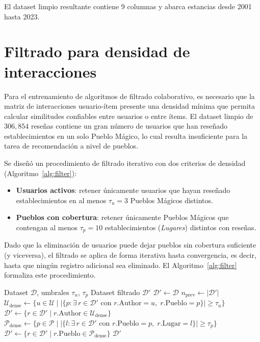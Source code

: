 El dataset limpio resultante contiene 9 columnas y abarca estancias desde 2001 hasta 2023.

\section{Filtrado para densidad de interacciones} \label{sec:filtering}

Para el entrenamiento de algoritmos de filtrado colaborativo, es necesario que la matriz de interacciones usuario-ítem presente una densidad mínima que permita calcular similitudes confiables entre usuarios o entre ítems. El dataset limpio de $306{,}854$ reseñas contiene un gran número de usuarios que han reseñado establecimientos en un solo Pueblo Mágico, lo cual resulta insuficiente para la tarea de recomendación a nivel de pueblos.

Se diseñó un procedimiento de filtrado iterativo con dos criterios de densidad (Algoritmo~\ref{alg:filter}):

\begin{itemize}
	\item \textbf{Usuarios activos}: retener únicamente usuarios que hayan reseñado establecimientos en al menos $\tau_u = 3$ Pueblos Mágicos distintos.
	\item \textbf{Pueblos con cobertura}: retener únicamente Pueblos Mágicos que contengan al menos $\tau_p = 10$ establecimientos (\textit{Lugares}) distintos con reseñas.
\end{itemize}

Dado que la eliminación de usuarios puede dejar pueblos sin cobertura suficiente (y viceversa), el filtrado se aplica de forma iterativa hasta convergencia, es decir, hasta que ningún registro adicional sea eliminado. El Algoritmo~\ref{alg:filter} formaliza este procedimiento.

\begin{algorithm}[ht]
	\caption{Filtrado iterativo para densidad de interacciones.}
	\label{alg:filter}
	\begin{algorithmic}[1]
		\REQUIRE Dataset $\mathcal{D}$, umbrales $\tau_u$, $\tau_p$
		\ENSURE Dataset filtrado $\mathcal{D}'$
		\STATE $\mathcal{D}' \leftarrow \mathcal{D}$
		\REPEAT
		\STATE $n_{\text{prev}} \leftarrow |\mathcal{D}'|$
		\STATE $\mathcal{U}_{\text{dense}} \leftarrow \{u \in \mathcal{U} \mid |\{p : \exists\, r \in \mathcal{D}' \text{ con } r.\text{Author} = u,\; r.\text{Pueblo} = p\}| \geq \tau_u\}$
		\STATE $\mathcal{D}' \leftarrow \{r \in \mathcal{D}' \mid r.\text{Author} \in \mathcal{U}_{\text{dense}}\}$
		\STATE $\mathcal{P}_{\text{dense}} \leftarrow \{p \in \mathcal{P} \mid |\{l : \exists\, r \in \mathcal{D}' \text{ con } r.\text{Pueblo} = p,\; r.\text{Lugar} = l\}| \geq \tau_p\}$
		\STATE $\mathcal{D}' \leftarrow \{r \in \mathcal{D}' \mid r.\text{Pueblo} \in \mathcal{P}_{\text{dense}}\}$
		\RETURN $\mathcal{D}'$
	\end{algorithmic}
\end{algorithm}

